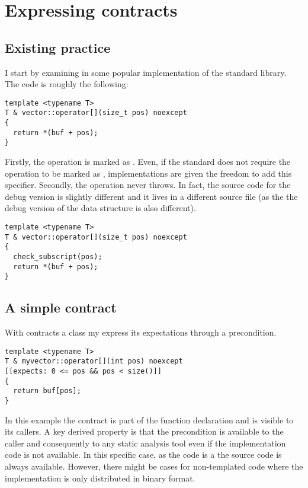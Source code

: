 \section{Expressing contracts}

\subsection{Existing practice}

I start by examining \cppid{[]} in some popular
implementation of the standard library. The code is roughly the following:

\begin{lstlisting}
template <typename T>
T & vector::operator[](size_t pos) noexcept
{
  return *(buf + pos);
}
\end{lstlisting}

Firstly, the operation is marked as . Even, if the standard
does not require the operation to be marked as ,
implementations are given the freedom to add this specifier. Secondly, the
operation never throws. In fact, the source code for the debug version is
slightly different and it lives in a different source file (as the the debug
version of the data structure is also different).

\begin{lstlisting}
template <typename T>
T & vector::operator[](size_t pos) noexcept
{
  check_subscript(pos);
  return *(buf + pos);
}
\end{lstlisting}

\subsection{A simple contract}

With contracts a class my express its expectations through a precondition.

\begin{lstlisting}
template <typename T>
T & myvector::operator[](int pos) noexcept
[[expects: 0 <= pos && pos < size()]] 
{
  return buf[pos];
}
\end{lstlisting}

In this example the contract is part of the function declaration and is visible
to its callers. A key derived property is that the precondition is available to
the caller and consequently to any static analysis tool even if the
implementation code is not available. In this specific case, as the code is a
 the source code is always available. However, there might be
cases for non-templated code where the implementation is only distributed in
binary format.

